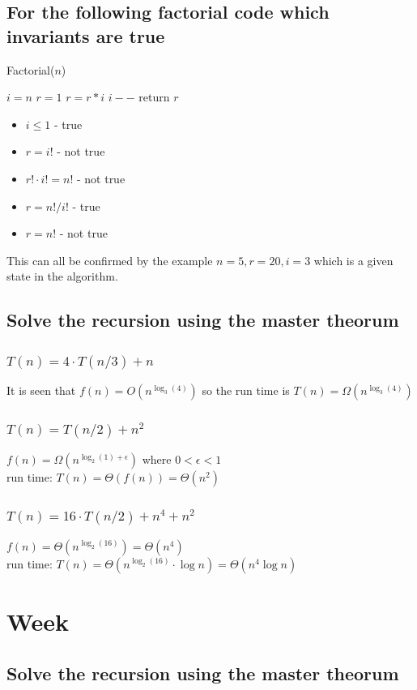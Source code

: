 \documentclass[12pt, a4paper]{article}
\begin{document}
			\subsection{For the following factorial code which invariants are true}
				Factorial($n$)
				\begin{algorithmic}[1]
					\State $i = n$
					\State $r = 1$
						\State $r = r * i$
						\State $ i--$
					\EndWhile
					\State return $r$
				\end{algorithmic}
				 \begin{itemize}
				 	\item $i\leq 1$ - true
				 	\item $r = i!$ - not true
				 	\item $r! \cdot i! = n!$ - not true
				 	\item $r = n!/i!$ - true
				 	\item $r=n!$ - not true
				\end{itemize}
				This can all be confirmed by the example $n=5,r=20,i=3$ which is a given state in the algorithm.
			\subsection{Solve the recursion using the master theorum}
				\subsubsection{$T(n)=4\cdot T(n/3)+n$}
					It is seen that $f(n)=O(n^{\log_3(4)})$ so the run time is $T(n)=\Omega (n^{\log_3(4)})$
				\subsubsection{$T(n)=T(n/2)+n^2$}
					$f(n)=\Omega(n^{\log_2(1)+\epsilon})$ where $0 < \epsilon < 1$\\
					run time: $T(n)=\Theta(f(n))=\Theta(n^2)$
				\subsubsection{$T(n)=16\cdot T(n/2)+n^4+n^2$}
					$f(n)=\Theta(n^{\log_2(16)})=\Theta(n^4)$\\
					run time: $T(n)=\Theta(n^{\log_2(16)}\cdot \log n)=\Theta(n^4 \log n)$
		\section{Week}
			\subsection{Solve the recursion using the master theorum}
\end{document}
